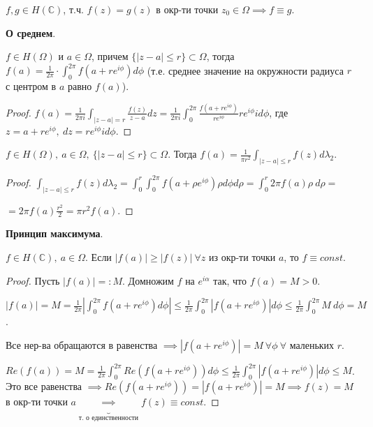 \begin{consequence}
    $f, g \in H(\mathbb{C})$, т.ч. $f(z) = g(z)$ в окр-ти точки $z_0 \in \Omega \implies f \equiv g$.
\end{consequence}



\begin{theorem}
    \textbf{О среднем}.

    $f \in H(\Omega)$ и $a \in \Omega$, причем $\{ |z - a| \leq r \} \subset \Omega$, тогда $f(a) = \frac{1}{2\pi} \cdot \int_{0}^{2\pi} { f(a + r e^{i \phi}) d \phi }$ (т.е. среднее значение на окружности радиуса $r$ с центром в $a$ равно $f(a)$).
\end{theorem}
\begin{proof}
    $f(a) = \frac{1}{2 \pi i}\int_{|z - a| = r}{ \frac{f(z)}{z - a} dz } = \frac{1}{2 \pi i} \int_{0}^{2\pi} { \frac{f(a + r e^{i \phi})}{r e^{i \phi}} r e^{i \phi} i d \phi }$, где $z = a+re^{i\phi}, \ dz = r e^{i \phi} i d \phi$.
\end{proof}

\begin{consequence}
    $f \in H(\Omega), \ a \in \Omega, \ \{ |z - a| \leq r \} \subset \Omega$. Тогда $f(a) = \frac{1}{\pi r^2} \int_{|z-a|\leq r} { f(z) d \lambda_2 }$.
\end{consequence}
\begin{proof}
    $\int_{|z-a| \leq r} { f(z) d \lambda_2 } = \int_{0}^{r} { \int_{0}^{2\pi} {f(a + \rho e^{i\phi}) \rho d \phi } d \rho } = \int_{0}^{r} { 2 \pi f(a) \rho \ d \rho } =$

    $= 2 \pi f(a) \frac{r^2}{2} = \pi r^2 f(a)$.
\end{proof}

\begin{theorem}
    \textbf{Принцип максимума}.

    $f \in H(\mathbb{C}), \ a \in \Omega$. Если $|f(a)| \geq |f(z)| \ \forall z$ из окр-ти точки $a$, то $f \equiv const$.
\end{theorem}
\begin{proof}
    Пусть $|f(a)| =: M$. Домножим $f$ на $e^{i \alpha}$ так, что $f(a) = M > 0$.

    $|f(a)| = M = \frac{1}{2\pi} \left|\int_{0}^{2\pi} { f(a + r e^{i \phi}) d \phi }\right| \leq \frac{1}{2 \pi} \int_{0}^{2\pi} { |f(a + r e^{i \phi})| d \phi} \leq \frac{1}{2\pi} \int_{0}^{2\pi} { M \ d \phi } = M$.

    Все нер-ва обращаются в равенства $\implies |f(a + r e^{i \phi})| = M \ \forall \phi \ \forall$ маленьких $r$.

    $Re (f(a)) = M = \frac{1}{2\pi} \int_{0}^{2\pi} { Re(f(a + r e^{i \phi})) d \phi } \leq \frac{1}{2 \pi} \int_{0}^{2\pi} { |f(a + r e^{i \phi})| d \phi } \leq M$. Это все равенства $\implies Re (f(a + r e^{i \phi})) = |f(a + r e^{i \phi})| = M \implies f(z) = M$ в окр-ти точки $a \underbrace{\implies}_{\text{т. о единственности}} f(z) \equiv const$.
\end{proof}


